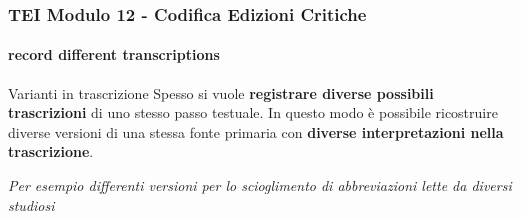 \begin{frame}
    \frametitle{TEI Modulo 12 - Codifica Edizioni Critiche}
    \framesubtitle{record different transcriptions}
    \addtocounter{nframe}{1}
    







    \begin{block}{Varianti in trascrizione}
       Spesso si vuole \textbf{registrare diverse possibili trascrizioni} di uno stesso passo testuale. In questo modo è possibile ricostruire diverse versioni di una stessa fonte primaria con \textbf{diverse interpretazioni nella trascrizione}.
    \end{block}
    \textit{Per esempio differenti versioni per lo scioglimento di abbreviazioni lette da diversi studiosi}

\end{frame}


